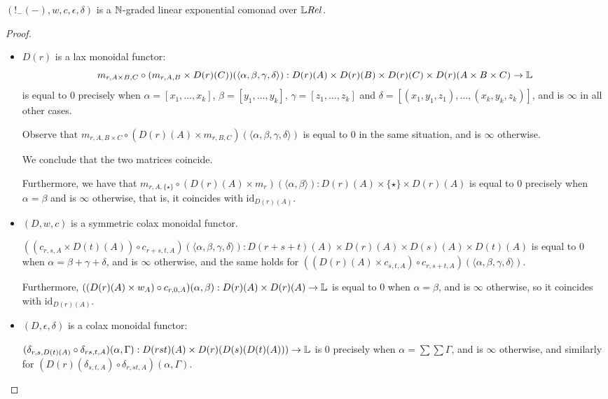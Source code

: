\begin{proposition}
 $(!_{-}(-),w,c,\epsilon,\delta)$  is a $\mathbb{N}$-graded linear exponential comonad over $\LREL$.
\end{proposition}
\begin{proof}
\begin{itemize}

\item $D(r)$ is a lax monoidal functor:
 $$ m_{r,A\times B,C}\circ (m_{r,A,B}\times D(r)(C))(\langle \alpha,\beta,\gamma,\delta\rangle)
 :
 D(r)(A)\times D(r)(B)\times D(r)(C) \times D(r)(A\times B\times C)\to \mathbb{L}
 $$
 is equal to $0$ 
precisely when $\alpha=[x_{1},\dots, x_{k}]$, $\beta=[y_{1},\dots, y_{k}]$, $\gamma=[z_{1},\dots, z_{k}]$ and 
$\delta= [(x_{1},y_{1},z_{1}),\dots, (x_{k},y_{k},z_{k})]$, and is $\infty $ in all other cases.

Observe that
$m_{r,A,B\times C}\circ (D(r)(A)\times m_{r,B,C})(\langle\alpha,\beta,\gamma, \delta\rangle)
  $ is equal to $0$ in the same situation, and is $\infty$ otherwise.
 
 We conclude that the two matrices coincide.
 
 Furthermore, we have that 
 $m_{r,A,\{\star\}}\circ (D(r)(A)\times m_{r})(\langle \alpha,\beta\rangle): D(r)(A)\times \{\star\} \times D(r)(A)$ is equal to $0$ 
 precisely when $\alpha=\beta$ and is $\infty$ otherwise, that is, it coincides with $\mathrm{id}_{D(r)(A)}$. 
 


\item $(D,w,c)$ is a symmetric colax monoidal functor.


$((c_{r,s,A}\times D(t)(A))\circ c_{r+s,t,A}) (\langle \alpha,\beta,\gamma,\delta\rangle)
: D(r+s+t)(A)\times D(r)(A)\times D(s)(A)\times D(t)(A)$
is equal to $0$ when $\alpha=\beta+\gamma+\delta$, and is $\infty$ otherwise, and the same holds for
$((D(r)(A)\times c_{s,t,A})\circ c_{r,s+t,A}) (\langle \alpha,\beta,\gamma,\delta\rangle)
$.

Furthermore, 
$((D(r)(A)\times w_{A})\circ c_{r,0,A})(\alpha,\beta)
: D(r)(A)\times D(r)(A)\to \mathbb{L}$ is equal to $0$ when 
$\alpha=\beta$, and is $\infty$ otherwise, so it coincides with 
$\mathrm{id}_{D(r)(A)}$.

\item $(D,\epsilon,\delta)$ is a colax monoidal functor:

$(\delta_{r,s,D(t)(A)}\circ \delta_{rs,t,A})
(\alpha, \Gamma)
: D(rst)(A) \times D(r)(D(s)(D(t)(A))) \to \mathbb{L}
$
is $0$ precisely when $\alpha = \sum \sum \Gamma$, and is $\infty$ otherwise, and similarly for 
$(D(r)(\delta_{s,t,A})\circ \delta_{r,st,A})(\alpha,\Gamma)$.



\end{itemize}
\end{proof}
